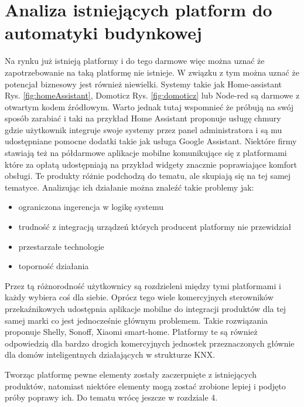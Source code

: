 \chapter{Analiza istniejących platform do automatyki budynkowej}
Na rynku już istnieją platformy i do tego darmowe więc można uznać że zapotrzebowanie na taką platformę nie istnieje. W związku z tym można uznać że potencjał biznesowy jest również niewielki. Systemy takie jak Home-assistant Rys.  \ref{fig:homeAssistant}, Domoticz Rys. \ref{fig:domoticz} lub Node-red są darmowe z otwartym kodem źródłowym. Warto jednak tutaj wspomnieć że próbują na swój sposób zarabiać i taki na przykład Home Assistant proponuje usługę chmury gdzie użytkownik integruje swoje systemy przez panel administratora i są mu udostępniane pomocne dodatki takie jak usługa Google Assistant.
Niektóre firmy stawiają też na półdarmowe aplikacje mobilne komunikujące się z platformami które za opłatą udostępniają na przykład widgety znacznie poprawiające komfort obsługi.
Te produkty różnie podchodzą do tematu, ale skupiają się na tej samej tematyce. Analizując ich działanie można znaleźć takie problemy jak:
\begin{itemize}
    \item ograniczona ingerencja w logikę systemu
    \item trudność z integracją urządzeń których producent platformy nie przewidział
    \item przestarzałe technologie
    \item toporność działania
\end{itemize}
Przez tą różnorodność użytkownicy są rozdzieleni między tymi platformami i każdy wybiera coś dla siebie.
Oprócz tego wiele komercyjnych sterowników przekaźnikowych udostępnia aplikacje mobilne do integracji produktów dla tej samej marki co jest jednocześnie głównym problemem. Takie rozwiązania proponuje Shelly, Sonoff, Xiaomi smart-home. Platformy te są również odpowiedzią dla bardzo drogich komercyjnych jednostek przeznaczonych  głównie dla domów inteligentnych działających w strukturze KNX. 
\par Tworząc platformę pewne elementy zostały zaczerpnięte z istniejących produktów, natomiast niektóre elementy mogą zostać zrobione lepiej i podjęto próby poprawy ich. Do tematu wrócę jeszcze w rozdziale 4.


